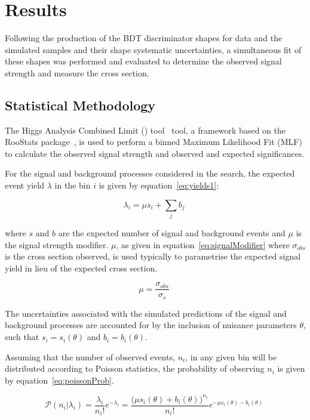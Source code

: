 \chapter{Results}\label{chapter:results}
Following the production of the BDT discriminator shapes for data and the simulated samples and their shape systematic uncertainties, a simultaneous fit of these shapes was performed and evaluated to determine the observed signal strength and measure the cross section.

\section{Statistical Methodology}\label{sec:statisticalModel}
The Higgs Analysis Combined Limit (\combine) tool~\cite{Combine} tool, a framework based on the RooStats package~\cite{Moneta:2010pm,Schott:2012zb}, is used to perform a binned Maximum Likelihood Fit (MLF) to 
calculate the observed signal strength and observed and expected significances.

For the signal and background processes considered in the search, the expected event yield $\lambda$ in the bin $i$ is given by equation~\ref{eq:yields1}:

\begin{equation}
\lambda_{i} = \mu s_{i} + \sum_{j} b_{j} \;
\label{eq:yields1}
\end{equation}

where $s$ and $b$ are the expected number of signal and background events and $\mu$ is the signal strength modifier.
$\mu$, as given in equation~\ref{eq:signalModifier} where $\sigma_{obs}$ is the cross section observed, is used typically to parametrise the expected signal yield in lieu of the expected cross section.

\begin{equation}
\mu = \frac{\sigma_{obs}}{\sigma_{s}}  \;
\label{eq:signalModifier}
\end{equation}

The uncertainties associated with the simulated predictions of the signal and background processes are accounted for by the inclusion of nuisance parameters $\theta$, such that $s_{i} = s_{i} (\theta)$ and $b_{i} = b_{i} (\theta)$.

Assuming that the number of observed events, $n_{i}$, in any given bin will be distributed according to Poisson statistics, the probability of observing $n_{i}$ is given by equation~\ref{eq:poissonProb}.

\begin{equation}
\mathcal{P} ( n_{i} | \lambda_{i} ) = \frac{\lambda_{i}}{n_{i}!} e^{- \lambda_{i}} = \frac{ \big( \mu s_{i}(\theta) + b_{i}(\theta) \big)^{n_{i}}}{n_{i} !} e^{- \mu s_{i}(\theta) - b_{i}(\theta)}  \;
\label{eq:poissonProb}
\end{equation}

